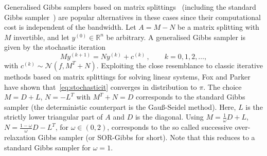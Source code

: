 \documentclass[
fontsize=11pt,
paper=a4,
numbers=noenddot
]{scrartcl}
\begin{document}

Generalised Gibbs samplers based on matrix splittings~\cite{foxparker} (including the standard Gibbs sampler~\cite{gemangeman}) are popular alternatives in these cases since their computational cost is independent of the bandwidth. Let $A = M - N$ be a matrix splitting with $M$ invertible, and let $y^{(0)} \in \mathbb{R}^n$ be arbitrary. A generalised Gibbs sampler is given by the stochastic iteration
\begin{equation}
    \label{eq:stochasticit}
    M y^{(k+1)} = N y^{(k)} + c^{(k)}\,,\qquad k = 0,1,2, \dotsc,
\end{equation}
with $c^{(k)} \sim \mathcal{N}(f, M^T + N)$. Exploiting the close resemblance to classic iterative methods based on matrix splittings for solving linear systems, Fox and Parker~\cite{foxparker} have shown that~\eqref{eq:stochasticit} converges in distribution to $\pi$. 
The choice $M = D + L$, $N = -L^T$ with $M^T + N = D$ corresponds to the standard Gibbs sampler (the deterministic counterpart is the Gauß-Seidel method). Here, $L$ is the strictly lower triangular part of $A$ and $D$ is the diagonal. Using $M = \frac{1}{\omega} D + L$, $N = \frac{1-\omega}{\omega} D - L^T$, for $\omega \in (0,2)$, corresponds to the so called successive over-relaxation Gibbs sampler (or SOR-Gibbs for short). Note that this reduces to a standard Gibbs sampler for $\omega = 1$.
\end{document}

